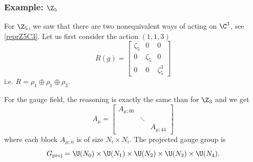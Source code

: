 \documentclass{worksheetclass}
\begin{document}
        \subsubsection{Example: $\Z_5$}

            For $\Z_5$, we saw that there are two nonequivalent ways of acting on $\C^3$, see \eqref{reprZ5C3}. Let us first consider the action $(1,1,3)$
            \begin{equation}
                R(g)=
                \begin{bmatrix}
                    \zeta_5 & 0 & 0\\
                    0 & \zeta_5 & 0\\
                    0 & 0 & \zeta^3_5
                \end{bmatrix}
            \end{equation}
            i.e. $R=\rho_1\oplus\rho_1\oplus\rho_3$.

            For the gauge field, the reasoning is exactly the same than for $\Z_3$ and we get
            \begin{equation}
                A_\mu=
                \begin{bmatrix}
                    A_{\mu;00} & & \\
                    & \ddots & \\
                    & & A_{\mu;44}
                \end{bmatrix}
            \end{equation}
            where each block $A_{\mu;ii}$ is of size $N_i\times N_i$. The projected gauge group is
            \begin{equation}
                G_{\text{proj}} = \U(N_0)\times\U(N_1)\times\U(N_2)\times\U(N_3)\times\U(N_4).
            \end{equation}
\end{document}
